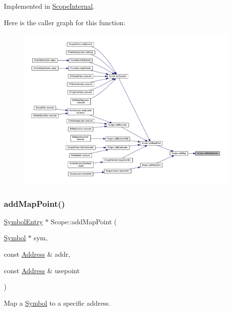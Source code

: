 Implemented in \mbox{\hyperlink{class_scope_internal_a3b6e20fcb0624056020f2fc20d0a06ee}{Scope\+Internal}}.

Here is the caller graph for this function\+:
\nopagebreak
\begin{figure}[H]
\begin{center}
\leavevmode
\includegraphics[width=350pt]{class_scope_aec0451f131ea214a174e00a434be36e9_icgraph}
\end{center}
\end{figure}
\mbox{\label{class_scope_a03a0309ce54c25e56871edbfdfe25675}} 
\subsubsection{\texorpdfstring{addMapPoint()}{addMapPoint()}}
{\footnotesize\ttfamily \mbox{\hyperlink{class_symbol_entry}{Symbol\+Entry}} $\ast$ Scope\+::add\+Map\+Point (\begin{DoxyParamCaption}\item[{\mbox{\hyperlink{class_symbol}{Symbol}} $\ast$}]{sym,  }\item[{const \mbox{\hyperlink{class_address}{Address}} \&}]{addr,  }\item[{const \mbox{\hyperlink{class_address}{Address}} \&}]{usepoint }\end{DoxyParamCaption})}



Map a \mbox{\hyperlink{class_symbol}{Symbol}} to a specific address. 

